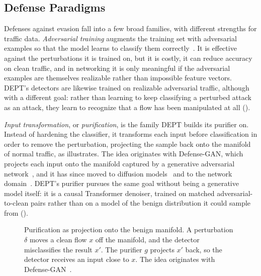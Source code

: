 \subsection{Defense Paradigms}\label{subsec:bg-defense-paradigms}
Defenses against evasion fall into a few broad families, with different strengths for
traffic data. \emph{Adversarial training} augments the training set with adversarial
examples so that the model learns to classify them correctly~\cite{madry2018towards}. It is
effective against the perturbations it is trained on, but it is costly, it can reduce
accuracy on clean traffic, and in networking it is only meaningful if the adversarial
examples are themselves realizable rather than impossible feature vectors. DEPT's
detectors are likewise trained on realizable adversarial traffic, although with a
different goal: rather than learning to keep classifying a perturbed attack as an attack,
they learn to recognize that a flow has been manipulated at all ().

\emph{Input transformation}, or \emph{purification}, is the family DEPT builds its purifier
on. Instead of hardening the classifier, it transforms each input before classification in
order to remove the perturbation, projecting the sample back onto the manifold of normal
traffic, as  illustrates. The idea originates with Defense-GAN,
which projects each input onto the manifold captured by a generative adversarial
network~\cite{samangouei2018defense}, and it has since moved to diffusion
models~\cite{li2025adbm} and to the network domain~\cite{alhussien2024advpurrec,merzouk2024diffusion}.
DEPT's purifier pursues the same
goal without being a generative model itself: it is a causal Transformer denoiser,
trained on matched adversarial-to-clean pairs rather than on a model of the benign
distribution it could sample from ().

\begin{figure}[htbp]
    \centering
    
    \caption[Purification as projection onto the benign manifold.]{Purification as projection onto the benign manifold. A perturbation $\delta$ moves a clean flow $x$ off the manifold, and the detector misclassifies the result $x'$. The purifier $g$ projects $x'$ back, so the detector receives an input close to $x$. The idea originates with Defense-GAN~\cite{samangouei2018defense}.}
    \label{fig:bg-purification}
\end{figure}

